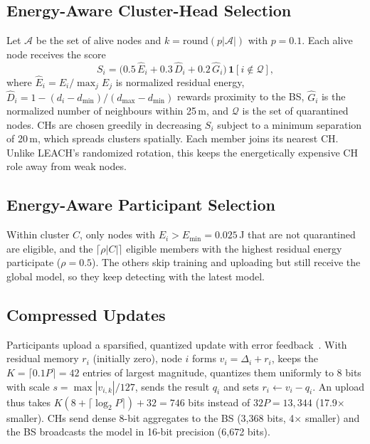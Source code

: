 \documentclass[journal,onecolumn,draftclsnofoot,12pt]{IEEEtran}
\begin{document}
\subsection{Energy-Aware Cluster-Head Selection}
Let $\mathcal{A}$ be the set of alive nodes and $k=\mathrm{round}(p|\mathcal{A}|)$ with $p=0.1$. Each alive node receives the score
\begin{equation}
S_i=\big(0.5\,\hat E_i+0.3\,\hat D_i+0.2\,\hat G_i\big)\,\mathbf{1}[i\notin\mathcal{Q}],
\end{equation}
where $\hat E_i=E_i/\max_j E_j$ is normalized residual energy, $\hat D_i=1-(d_i-d_{\min})/(d_{\max}-d_{\min})$ rewards proximity to the BS, $\hat G_i$ is the normalized number of neighbours within 25\,m, and $\mathcal{Q}$ is the set of quarantined nodes. CHs are chosen greedily in decreasing $S_i$ subject to a minimum separation of 20\,m, which spreads clusters spatially. Each member joins its nearest CH. Unlike LEACH's randomized rotation, this keeps the energetically expensive CH role away from weak nodes.

\subsection{Energy-Aware Participant Selection}
Within cluster $C$, only nodes with $E_i>E_{\min}=0.025$\,J that are not quarantined are eligible, and the $\lceil\rho|C|\rceil$ eligible members with the highest residual energy participate ($\rho=0.5$). The others skip training and uploading but still receive the global model, so they keep detecting with the latest model.

\subsection{Compressed Updates}
Participants upload a sparsified, quantized update with error feedback~\cite{stich2018,lin2018dgc}. With residual memory $r_i$ (initially zero), node $i$ forms $v_i=\Delta_i+r_i$, keeps the $K=\lceil0.1P\rceil=42$ entries of largest magnitude, quantizes them uniformly to 8 bits with scale $s=\max|v_{i,k}|/127$, sends the result $q_i$ and sets $r_i\leftarrow v_i-q_i$. An upload thus takes $K(8+\lceil\log_2P\rceil)+32=746$ bits instead of $32P=13{,}344$ (17.9$\times$ smaller). CHs send dense 8-bit aggregates to the BS (3,368 bits, 4$\times$ smaller) and the BS broadcasts the model in 16-bit precision (6,672 bits).
\end{document}
